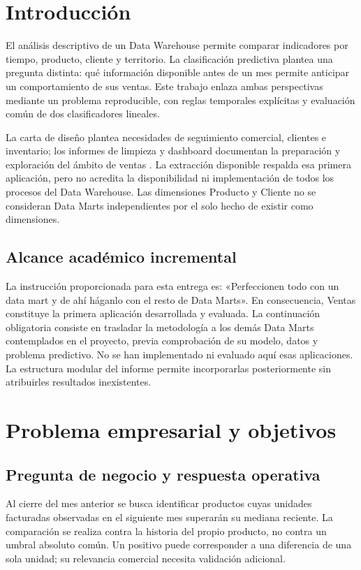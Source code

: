 \section{Introducción}
El análisis descriptivo de un Data Warehouse permite comparar indicadores por tiempo, producto, cliente y territorio. La clasificación predictiva plantea una pregunta distinta: qué información disponible antes de un mes permite anticipar un comportamiento de sus ventas. Este trabajo enlaza ambas perspectivas mediante un problema reproducible, con reglas temporales explícitas y evaluación común de dos clasificadores lineales.

La carta de diseño plantea necesidades de seguimiento comercial, clientes e inventario; los informes de limpieza y dashboard documentan la preparación y exploración del ámbito de ventas \cite{carta,limpieza,dashboard}. La extracción disponible respalda esa primera aplicación, pero no acredita la disponibilidad ni implementación de todos los procesos del Data Warehouse. Las dimensiones Producto y Cliente no se consideran Data Marts independientes por el solo hecho de existir como dimensiones.

\subsection{Alcance académico incremental}
La instrucción proporcionada para esta entrega es: «Perfeccionen todo con un data mart y de ahí háganlo con el resto de Data Marts». En consecuencia, Ventas constituye la primera aplicación desarrollada y evaluada. La continuación obligatoria consiste en trasladar la metodología a los demás Data Marts contemplados en el proyecto, previa comprobación de su modelo, datos y problema predictivo. No se han implementado ni evaluado aquí esas aplicaciones. La estructura modular del informe permite incorporarlas posteriormente sin atribuirles resultados inexistentes.

\section{Problema empresarial y objetivos}
\subsection{Pregunta de negocio y respuesta operativa}
Al cierre del mes anterior se busca identificar productos cuyas unidades facturadas observadas en el siguiente mes superarán su mediana reciente. La comparación se realiza contra la historia del propio producto, no contra un umbral absoluto común. Un positivo puede corresponder a una diferencia de una sola unidad; su relevancia comercial necesita validación adicional.


